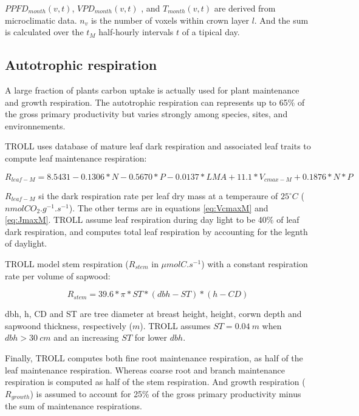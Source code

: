 \documentclass[]{article}
\theoremstyle{definition}
\theoremstyle{definition}
\theoremstyle{remark}
\begin{document}
\(PPFD_{month}(v,t)\), \(VPD_{month}(v,t)\) , and \(T_{month}(v,t)\) are
derived from microclimatic data. \(n_v\) is the number of voxels within
crown layer \(l\). And the sum is calculated over the \(t_M\)
half-hourly intervals \(t\) of a tipical day.

\subsection{Autotrophic respiration}\label{autotrophic-respiration}

A large fraction of plants carbon uptake is actually used for plant
maintenance and growth respiration. The autotrophic respiration can
represents up to 65\% of the gross primary productivity but varies
strongly among species, sites, and environnements.

TROLL uses \citet{Atkin2015} database of mature leaf dark respiration
and associated leaf traits to compute leaf maintenance respiration:

\begin{equation}
  R_{leaf-M} = 8.5431-0.1306*N-0.5670*P-0.0137*LMA+11.1*V_{cmax-M}+0.1876*N*P
  \label{eq:Rl}
\end{equation}

\(R_{leaf-M}\) si the dark respiration rate per leaf dry mass at a
temperaure of \(25^\circ C\) (\(nmolCO_2.g^{-1}.s^{-1}\)). The other
terms are in equations \eqref{eq:VcmaxM} and \eqref{eq:JmaxM}. TROLL assume
leaf respiration during day light to be 40\% of leaf dark respiration,
and computes total leaf respiration by accounting for the legnth of
daylight.

TROLL model stem respiration (\(R_{stem}\) in \(\mu molC.s^{-1}\)) with
a constant respiration rate per volume of sapwood:

\begin{equation}
  R_{stem} = 39.6*\pi*ST*(dbh-ST)*(h-CD)
  \label{eq:Rs}
\end{equation}

dbh, h, CD and ST are tree diameter at breast height, height, corwn
depth and sapwoond thickness, respectively (\(m\)). TROLL assumes
\(ST=0.04~m\) when \(dbh>30~cm\) and an increasing \(ST\) for lower
\(dbh\).

Finally, TROLL computes both fine root maintenance respiration, as half
of the leaf maintenance respiration. Whereas coarse root and branch
maintenance respiration is computed as half of the stem respiration. And
growth respiration (\(R_{growth}\)) is assumed to account for 25\% of
the gross primary productivity minus the sum of maintenance
respirations.
\end{document}
